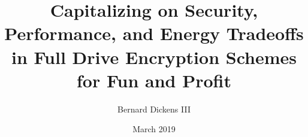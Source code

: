 \documentclass{ucetd}
\title{Capitalizing on Security, Performance, and Energy Tradeoffs in Full Drive Encryption Schemes for Fun and Profit}
\author{Bernard Dickens III}
\date{March 2019}
\begin{document}
\maketitle


\tableofcontents
\listoftables


\abstract


\mainmatter






%
%

\clearpage
\printbibliography
\end{document}
